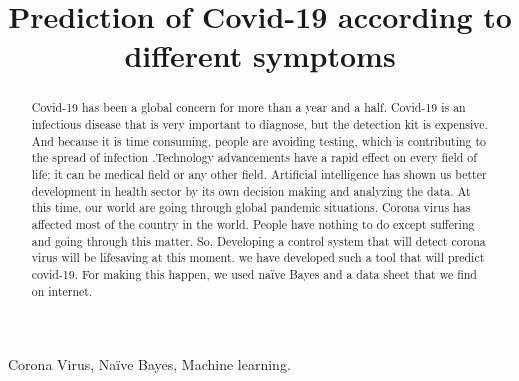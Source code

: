 \documentclass[conference]{IEEEtran}
\begin{document}
\title{Prediction of Covid-19  according to different symptoms}

\author{
\and
{}
\and
{}
}
\maketitle

\begin{abstract}
 Covid-19 has been a global concern for more than a year and a half. Covid-19 is an infectious disease that is very important to diagnose, but the detection kit is expensive. And because it is time consuming, people are avoiding testing, which is contributing to the spread of infection .Technology advancements have a rapid effect on every field of life; it can be medical field or any other field. Artificial intelligence has shown us better development in health sector by its own decision making and analyzing the data. At this time, our world are going through global pandemic situations. Corona virus has affected most of the country in the world. People have nothing to do except suffering and going through this matter. So, Developing a control system that will detect corona virus will be lifesaving at this moment.  we have developed such a tool that will predict covid-19. For making this happen, we used naïve Bayes and a data sheet that we find on internet.

\end{abstract}

\begin{IEEEkeywords}
Corona Virus, Naïve Bayes, Machine learning.
\end{IEEEkeywords}
\end{document}
